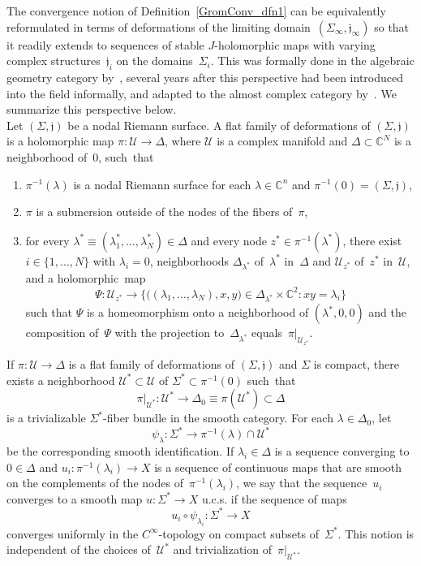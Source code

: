 \documentclass[11pt]{article}
\numberwithin{equation}{section}
\theoremstyle{definition}
\def\sf#1{\textsf{#1}}
\def\lra{\longrightarrow}
\def\C{\mathbb{C}}
\def\fj{\mathfrak j}
\def\cU{\mathcal U}
\def\la{\lambda}
\def\De{\Delta}
\def\Si{\Sigma}
\def\i{\infty}
\begin{document}
\noindent
The convergence notion of Definition~\ref{GromConv_dfn1} can be equivalently  reformulated 
in terms of deformations of the limiting domain~$(\Si_{\i},\fj_{\i})$
so that  it readily extends to sequences of stable $J$-holomorphic maps 
with varying complex structures~$\fj_i$ on the domains~$\Si_i$.
This was formally done in the algebraic geometry category by~\cite{FPa},
several years after this perspective had been introduced into the field informally,
and adapted to the almost complex category by~\cite{LT}.
We summarize this perspective below.\\

\noindent
Let $(\Si,\fj)$ be a nodal Riemann surface. 
A \sf{flat family of deformations} of $(\Si,\fj)$ is a holomorphic map
$\pi\!:\cU\!\lra\!\De$, where $\cU$ is a complex manifold and $\De\!\subset\!\C^N$
is a neighborhood of~$0$, such~that
\begin{enumerate}[label=$\bullet$,leftmargin=*]

\item $\pi^{-1}(\la)$ is a nodal Riemann surface for each $\la\!\in\!\C^n$ and
$\pi^{-1}(0)\!=\!(\Si,\fj)$,

\item  $\pi$ is a submersion outside of the nodes of the fibers of~$\pi$,

\item for every $\la^*\!\equiv\!(\la_1^*,\ldots,\la_N^*)\!\in\!\De$ and 
every node $z^*\!\in\!\pi^{-1}(\la^*)$, 
there exist $i\!\in\!\{1,\ldots,N\}$ with $\la_i\!=\!0$,
neighborhoods $\De_{\la^*}$ of~$\la^*$ in~$\De$ and $\cU_{z^*}$ of~$z^*$ in~$\cU$, 
and a holomorphic~map
$$\Psi\!:\cU_{z^*}\lra \big\{\big((\la_1,\ldots,\la_N),x,y\big)\!\in\!\De_{\la^*}\!\times\!\C^2\!:
xy\!=\!\la_i\big\}$$
such that $\Psi$ is a homeomorphism onto a neighborhood of $(\la^*,0,0)$
and the composition of~$\Psi$ with the projection to~$\De_{\la^*}$ equals~$\pi|_{\cU_{z^*}}$.
\end{enumerate} 

\vspace{.1in}

\noindent
If $\pi\!:\cU\!\lra\!\De$ is a flat family of deformations of $(\Si,\fj)$ and $\Si$ is compact,
there exists a neighborhood $\cU^*\!\subset\!\cU$ of $\Si^*\!\subset\!\pi^{-1}(0)$
such~that 
$$\pi|_{\cU^*}\!:\cU^*\lra \De_0\!\equiv\!\pi(\cU^*)\subset\De$$
is a trivializable $\Si^*$-fiber bundle in the smooth category.
For each $\la\!\in\!\De_0$, let 
$$\psi_{\la}\!:\Si^*\lra \pi^{-1}(\la)\!\cap\!\cU^*$$
be the corresponding smooth identification.
If $\la_i\!\in\!\De$ is a sequence converging to $0\!\in\!\De$
and \hbox{$u_i\!:\pi^{-1}(\la_i)\!\lra\!X$} is a sequence of continuous maps
that are smooth on the complements of the nodes of~$\pi^{-1}(\la_i)$,
we say that the sequence~$u_i$ \sf{converges to} a smooth map $u\!:\!\Si^*\!\lra\!X$
{\sf u.c.s.} if the sequence of maps
$$u_i\!\circ\!\psi_{\la_i}\!:\Si^*\lra X$$
converges uniformly in the $C^{\i}$-topology on compact  subsets of~$\Si^*$.
This notion is independent of the choices of~$\cU^*$ and 
trivialization of~$\pi|_{\cU^*}$.
\end{document}
